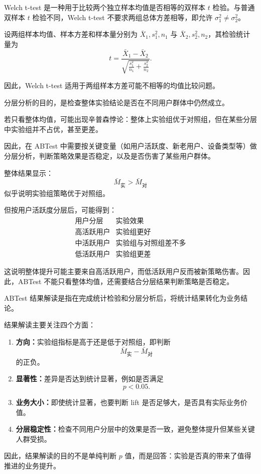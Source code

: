 \begin{definition}
Welch t-test 是一种用于比较两个独立样本均值是否相等的双样本 $t$ 检验。与普通双样本 $t$ 检验不同，Welch t-test 不要求两组总体方差相等，即允许 $\sigma_1^2 \neq \sigma_2^2$。

设两组样本均值、样本方差和样本量分别为 $\bar X_1,s_1^2,n_1$ 与 $\bar X_2,s_2^2,n_2$，其检验统计量为
\[
t=\frac{\bar X_1-\bar X_2}{\sqrt{\frac{s_1^2}{n_1}+\frac{s_2^2}{n_2}}}.
\]

因此，Welch t-test 适用于两组样本方差可能不相等的均值比较问题。
\end{definition}
\begin{note}[分层分析与辛普森悖论]
分层分析的目的，是检查整体实验结论是否在不同用户群体中仍然成立。

若只看整体均值，可能出现辛普森悖论：整体上实验组优于对照组，但在某些分层中实验组并不占优，甚至更差。

因此，在 ABTest 中需要按关键变量（如用户活跃度、新老用户、设备类型等）做分层分析，判断策略效果是否稳定，以及是否伤害了某些用户群体。
\end{note}
\begin{example}[分层分析中的异质性效果]
整体结果显示：
\[
\bar{M}_{\text{实}} > \bar{M}_{\text{对}}
\]
似乎说明实验组策略优于对照组。

但按用户活跃度分层后，可能得到：
\[
\begin{array}{c|c}
\text{用户分层} & \text{实验效果} \\
\hline
\text{高活跃用户} & \text{实验组更好} \\
\text{中活跃用户} & \text{实验组与对照组差不多} \\
\text{低活跃用户} & \text{实验组更差}
\end{array}
\]

这说明整体提升可能主要来自高活跃用户，而低活跃用户反而被新策略伤害。因此，ABTest 不能只看整体均值，还需要结合分层结果判断策略是否稳定。
\end{example}
\begin{definition}
ABTest 结果解读是指在完成统计检验和分层分析后，将统计结果转化为业务结论。

结果解读主要关注四个方面：
\begin{enumerate}
    \item \textbf{方向：}实验组指标是高于还是低于对照组，即判断
    \[
    \bar{M}_{\text{实}}-\bar{M}_{\text{对}}
    \]
    的正负。

    \item \textbf{显著性：}差异是否达到统计显著，例如是否满足
    \[
    p < 0.05.
    \]

    \item \textbf{业务大小：}即使统计显著，也要判断 lift 是否足够大，是否具有实际业务价值。

    \item \textbf{分层稳定性：}检查不同用户分层中的效果是否一致，避免整体提升但某些关键人群受损。
\end{enumerate}

因此，结果解读的目的不是单纯判断 $p$ 值，而是回答：实验是否真的带来了值得推进的业务提升。
\end{definition}